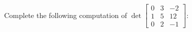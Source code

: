 \begin{applicationActivities}{2}{26}
%
%
%
%


\begin{activity}{5}
  Complete the following computation of
  $\det \begin{bmatrix} 0 & 3 & -2 \\ 1 & 5 & 12 \\ 0 & 2 & -1 \end{bmatrix}$:


\end{activity}
\end{applicationActivities}
